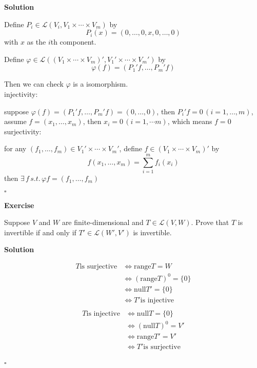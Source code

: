 \documentclass{article}
\newenvironment{exercise}{%
{\textbf{Exercise\\}
    }
}{
}
\newenvironment{solution}{%
{
    \textbf{Solution\\}
    }
}{
  \hfill $\square$ 
  \par\bigskip 
}
\newcommand{\range}{\text{range}}
\newcommand{\n}{\text{null}}
\begin{document}
\begin{CJK}{UTF8}{gkai}
\begin{solution}
    Define $P_i \in \mathcal{L}(V_i,V_1\times \cdots \times V_m)$ by 
    \[P_i(x) = (0,\ldots,0,x,0,\ldots,0)\]
    with $x$ as the $i$th component.

    Define $\varphi \in \mathcal{L}((V_1\times \cdots \times V_m)',V_1'\times \cdots\times V_m')$ by
    \[\varphi(f) = (P_1'f,\ldots,P_m'f)\]

    Then we can check $\varphi$ is a isomorphism.\\

    injectivity:

    suppose $\varphi(f) = (P_1'f,\ldots,P_m'f) = (0,\ldots,0)$, then $P_i'f = 0\,(i = 1,\ldots, m)$, assume $f = (x_1,\ldots,x_m)$, then $x_i = 0 \,(i = 1,\cdots m)$, which means $f = 0$\\

    surjectivity:

    for any $(f_1,\ldots,f_m) \in V_1'\times \cdots \times V_m'$, define $f \in (V_1\times \cdots\times V_m)'$ by
    \[f(x_1,\ldots,x_m) = \sum_{i = 1}^m f_i(x_i) \]
    then $\exists\, f \,s.t.\, \varphi f = (f_1,\ldots,f_m)$
\end{solution}

\begin{exercise}
    Suppose $V$ and $W$ are finite-dimensional and $T \in \mathcal{L}(V,W)$. Prove that $T$ is invertible if and only if $T' \in \mathcal{L}(W',V')$ is invertible.
\end{exercise}

\begin{solution}
    \[
    \begin{aligned}
        T \text{is surjective} &\Leftrightarrow \range T = W\\
        &\Leftrightarrow (\range T)^0 = \{0\}\\
        &\Leftrightarrow \n T' = \{0\}\\
        &\Leftrightarrow T' \text{is injective}\\  
    \end{aligned}
    \]
    \[
        \begin{aligned}
            T \text{is injective} &\Leftrightarrow \n T = \{0\}\\
            &\Leftrightarrow (\n T)^0 = V'\\
            &\Leftrightarrow \range T' = V'\\
            &\Leftrightarrow T' \text{is surjective}\\  
        \end{aligned}
        \]
\end{solution}


\end{CJK}
\end{document}
